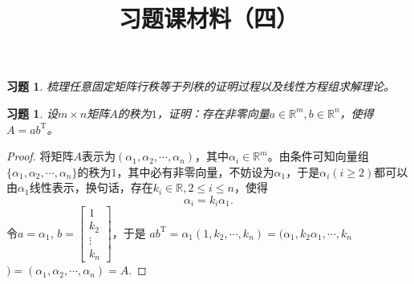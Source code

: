 \documentclass[UTF8]{ctexart}
\newtheorem{ex}[thm]{习题}
\begin{document}
\title{习题课材料（四）}

\date{}

\maketitle

\vspace{-1cm}




\begin{ex}
	梳理任意固定矩阵行秩等于列秩的证明过程以及线性方程组求解理论。
\end{ex}

\begin{ex}
	设$m \times n$矩阵$A$的秩为$1$，证明：存在非零向量$a \in \mathbb{R}^m, b \in \mathbb{R}^n$，使得$A = ab^{\mathrm{T}}$。
\end{ex}
\begin{proof}
	将矩阵$A$表示为$(\alpha_1, \alpha_2, \cdots, \alpha_n)$，其中$\alpha_i \in \mathbb{R}^m$。由条件可知向量组$\{\alpha_1, \alpha_2, \cdots, \alpha_n\}$的秩为$1$，其中必有非零向量，不妨设为$\alpha_1$，于是$\alpha_i(i \geq 2)$都可以由$\alpha_1$线性表示，换句话，存在$k_i \in \mathbb{R}, 2 \leq i \leq n$，使得
	\[
	\alpha_i = k_i \alpha_1.
	\]
	令$a = \alpha_1$, $b = \begin{bmatrix}
		1 \\
		k_2 \\
		\vdots \\
		k_{n}
	\end{bmatrix}$，于是
	$
	ab^{\mathrm{T}} = \alpha_1(1, k_2, \cdots, k_n) = (\alpha_1, k_2 \alpha_1, \cdots, k_n $$) = (\alpha_1, \alpha_2, \cdots, \alpha_n) = A.
	$
\end{proof} 
\end{document}
